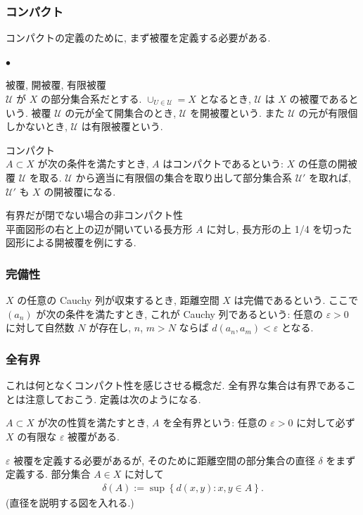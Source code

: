 \documentclass[openany, a4paper, oneside]{jsbook}
\newcounter{enum2}
\renewenvironment{itemize}{%
\begin{list}{$\bullet$\ \ }%
{%
\usecounter{enum2}
\setlength{\itemindent}{0pt}%
\setlength{\leftmargin}{15pt}%
\setlength{\rightmargin}{0pt}%
\setlength{\labelsep}{0pt}%
\setlength{\labelwidth}{6pt}%
\setlength{\itemsep}{0pt}%
\setlength{\parsep}{0pt}%
\setlength{\listparindent}{0pt}%
}
}{%
\end{list}%
}
\theoremstyle{break}
\theoremstyle{breakdefn}
\begin{document}
\subsubsection{コンパクト}


コンパクトの定義のために, まず被覆を定義する必要がある.
\begin{itemize}

\item 被覆, 開被覆, 有限被覆\\
%
$\mathcal{U}$ が $X$ の部分集合系だとする.
$\cup_{U \in \mathcal{U}} = X$ となるとき, $\mathcal{U}$ は $X$ の被覆であるという.
被覆 $\mathcal{U}$ の元が全て開集合のとき, $\mathcal{U}$ を開被覆という.
また $\mathcal{U}$ の元が有限個しかないとき, $\mathcal{U}$ は有限被覆という.

\item コンパクト\\
%
$A \subset X$ が次の条件を満たすとき, $A$ はコンパクトであるという:
$X$ の任意の開被覆 $\mathcal{U}$ を取る.
$\mathcal{U}$ から適当に有限個の集合を取り出して部分集合系 $\mathcal{U}'$ を取れば,
$\mathcal{U}'$ も $X$ の開被覆になる.

\item 有界だが閉でない場合の非コンパクト性\\
%
平面図形の右と上の辺が開いている長方形 $A$ に対し, 長方形の上 1/4 を切った図形による開被覆を例にする.
\end{itemize} %
\subsubsection{完備性}


$X$ の任意の Cauchy 列が収束するとき, 距離空間 $X$ は完備であるという.
ここで $\left ( a_n \right)$ が次の条件を満たすとき, これが Cauchy 列であるという:
任意の $\varepsilon > 0$ に対して自然数 $N$ が存在し, $n$, $m > N$ ならば $d (a_n, a_m) < \varepsilon$ となる.
\subsubsection{全有界}


これは何となくコンパクト性を感じさせる概念だ.
全有界な集合は有界であることは注意しておこう.
定義は次のようになる.

$A \subset X$ が次の性質を満たすとき, $A$ を全有界という:
任意の $\varepsilon > 0$ に対して必ず $X$ の有限な $\varepsilon$ 被覆がある.

$\varepsilon$ 被覆を定義する必要があるが, そのために距離空間の部分集合の直径 $\delta$ をまず定義する.
部分集合 $A \in X$ に対して
\begin{align}
 \delta (A)
 :=
 \sup \left\{ d (x, y) : x, y \in A \right\}.
\end{align}
(直径を説明する図を入れる.)
\end{document}
